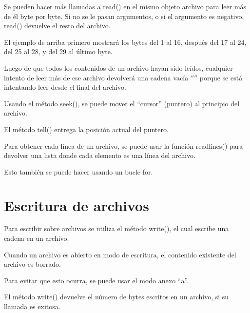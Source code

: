 \documentclass{report}
\newcommand{\doble}[1]{``#1''}
\begin{document}
Se pueden hacer más llamadas a read() en el mismo objeto archivo para leer más de él byte por byte. Si no se le pasan argumentos, o si el argumento es negativo, read() devuelve el resto del archivo.


El ejemplo de arriba primero mostrará los bytes del 1 al 16, después del 17 al 24, del 25 al 28, y del 29 al último byte.

Luego de que todos los contenidos de un archivo hayan sido leídos, cualquier intento de leer más de ese archivo devolverá una cadena vacía $''$$''$ porque se está intentando leer desde el final del archivo.


Usando el método seek(), se puede mover el \doble{cursor} (puntero) al principio del archivo.


El método tell() entrega la posición actual del puntero.


Para obtener cada línea de un archivo, se puede usar la función readlines() para devolver una lista donde cada elemento es una línea del archivo.


Esto también se puede hacer usando un bucle for.


\section{Escritura de archivos}

Para escribir sobre archivos se utiliza el método write(), el cual escribe una cadena en un archivo.


Cuando un archivo es abierto en modo de escritura, el contenido existente del archivo es borrado.


Para evitar que esto ocurra, se puede usar el modo anexo \doble{a}.


El método write() devuelve el número de bytes escritos en un archivo, si su llamada es exitosa.
\end{document}
